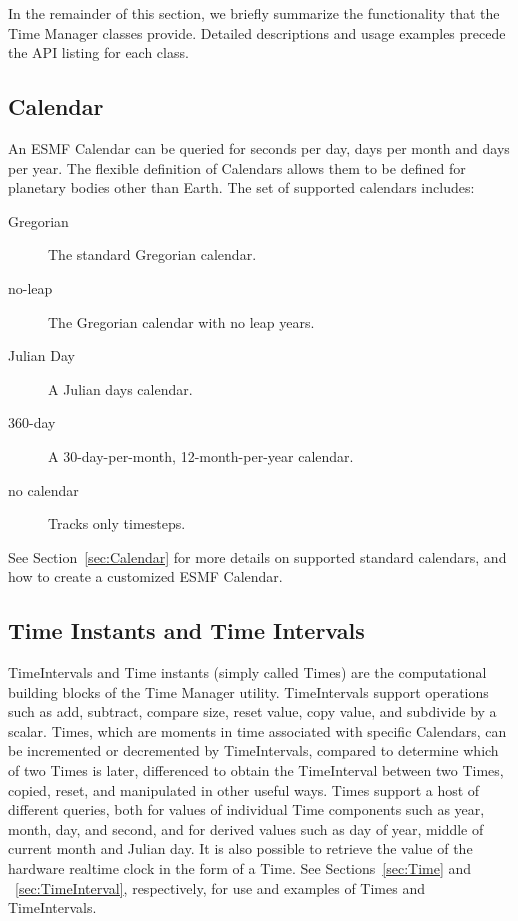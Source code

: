 \newpage
In the remainder of this section, we briefly summarize the 
functionality that the Time Manager classes provide.  Detailed 
descriptions and usage examples precede the API listing for each 
class.

\subsection{Calendar}
An ESMF Calendar can be queried for seconds per day, days per month 
and days per year.  The flexible definition of Calendars allows them
to be defined for planetary bodies other than Earth.  The set of supported 
calendars includes:
\begin{description}
\item [Gregorian] The standard Gregorian calendar.
\item [no-leap] The Gregorian calendar with no leap years.
\item [Julian Day] A Julian days calendar.
\item [360-day] A 30-day-per-month, 12-month-per-year calendar.
\item [no calendar] Tracks only timesteps.
\end{description}
See Section~\ref{sec:Calendar} for more details on supported standard 
calendars, and how to create a customized ESMF Calendar.

\subsection{Time Instants and Time Intervals}

TimeIntervals and Time instants (simply called Times) are the computational 
building blocks of the Time Manager utility.  TimeIntervals support operations
such as add, subtract, compare size, reset value, copy value, and subdivide
by a scalar.  Times, which are moments in time associated with specific
Calendars, can be incremented or decremented by TimeIntervals, compared to
determine which of two Times is later, differenced to obtain the TimeInterval
between two Times, copied, reset, and manipulated in other useful ways.
Times support a host of different queries, both for values of individual Time 
components such as year, month, day, and second, and for derived values such 
as day of year, middle of current month and Julian day.  It is also possible 
to retrieve the value of the hardware realtime clock in the form of a 
Time.  See Sections~\ref{sec:Time} and ~\ref{sec:TimeInterval}, respectively,
for use and examples of Times and TimeIntervals.

